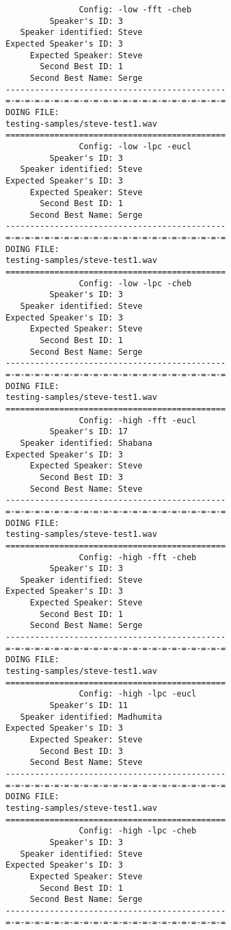 \begin{verbatim}
               Config: -low -fft -cheb
         Speaker's ID: 3
   Speaker identified: Steve
Expected Speaker's ID: 3
     Expected Speaker: Steve
       Second Best ID: 1
     Second Best Name: Serge
---------------------------------------------
=-=-=-=-=-=-=-=-=-=-=-=-=-=-=-=-=-=-=-=-=-=-=
DOING FILE:
testing-samples/steve-test1.wav
=============================================
               Config: -low -lpc -eucl
         Speaker's ID: 3
   Speaker identified: Steve
Expected Speaker's ID: 3
     Expected Speaker: Steve
       Second Best ID: 1
     Second Best Name: Serge
---------------------------------------------
=-=-=-=-=-=-=-=-=-=-=-=-=-=-=-=-=-=-=-=-=-=-=
DOING FILE:
testing-samples/steve-test1.wav
=============================================
               Config: -low -lpc -cheb
         Speaker's ID: 3
   Speaker identified: Steve
Expected Speaker's ID: 3
     Expected Speaker: Steve
       Second Best ID: 1
     Second Best Name: Serge
---------------------------------------------
=-=-=-=-=-=-=-=-=-=-=-=-=-=-=-=-=-=-=-=-=-=-=
DOING FILE:
testing-samples/steve-test1.wav
=============================================
               Config: -high -fft -eucl
         Speaker's ID: 17
   Speaker identified: Shabana
Expected Speaker's ID: 3
     Expected Speaker: Steve
       Second Best ID: 3
     Second Best Name: Steve
---------------------------------------------
=-=-=-=-=-=-=-=-=-=-=-=-=-=-=-=-=-=-=-=-=-=-=
DOING FILE:
testing-samples/steve-test1.wav
=============================================
               Config: -high -fft -cheb
         Speaker's ID: 3
   Speaker identified: Steve
Expected Speaker's ID: 3
     Expected Speaker: Steve
       Second Best ID: 1
     Second Best Name: Serge
---------------------------------------------
=-=-=-=-=-=-=-=-=-=-=-=-=-=-=-=-=-=-=-=-=-=-=
DOING FILE:
testing-samples/steve-test1.wav
=============================================
               Config: -high -lpc -eucl
         Speaker's ID: 11
   Speaker identified: Madhumita
Expected Speaker's ID: 3
     Expected Speaker: Steve
       Second Best ID: 3
     Second Best Name: Steve
---------------------------------------------
=-=-=-=-=-=-=-=-=-=-=-=-=-=-=-=-=-=-=-=-=-=-=
DOING FILE:
testing-samples/steve-test1.wav
=============================================
               Config: -high -lpc -cheb
         Speaker's ID: 3
   Speaker identified: Steve
Expected Speaker's ID: 3
     Expected Speaker: Steve
       Second Best ID: 1
     Second Best Name: Serge
---------------------------------------------
=-=-=-=-=-=-=-=-=-=-=-=-=-=-=-=-=-=-=-=-=-=-=

\end{verbatim}
